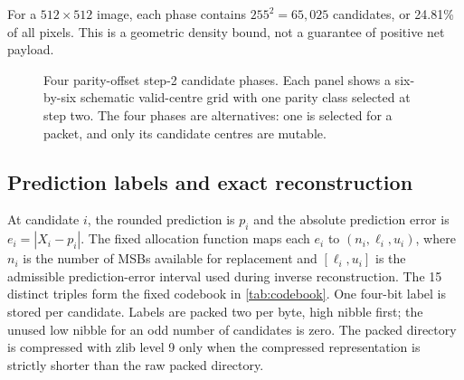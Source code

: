 \documentclass[preprint,12pt,a4paper]{elsarticle}
\begin{document}
For a $512\times512$ image, each phase contains $255^2=65,025$ candidates, or 24.81\% of all pixels. This is a geometric density bound, not a guarantee of positive net payload.

\begin{figure}[t]
\centering
{}
\caption{Four parity-offset step-2 candidate phases. Each panel shows a six-by-six schematic valid-centre grid with one parity class selected at step two. The four phases are alternatives: one is selected for a packet, and only its candidate centres are mutable.}
\label{fig:phases}
\end{figure}

\subsection{Prediction labels and exact reconstruction}

At candidate $i$, the rounded prediction is $p_i$ and the absolute prediction error is $e_i=|X_i-p_i|$. The fixed allocation function maps each $e_i$ to $(n_i,\ell_i,u_i)$, where $n_i$ is the number of MSBs available for replacement and $[\ell_i,u_i]$ is the admissible prediction-error interval used during inverse reconstruction. The 15 distinct triples form the fixed codebook in \cref{tab:codebook}. One four-bit label is stored per candidate. Labels are packed two per byte, high nibble first; the unused low nibble for an odd number of candidates is zero. The packed directory is compressed with zlib level 9 only when the compressed representation is strictly shorter than the raw packed directory.
\end{document}
